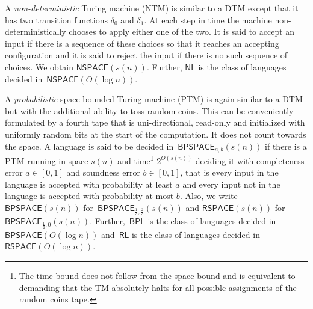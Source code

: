 A \emph{non-deterministic} Turing machine (NTM) is similar to a DTM except that it has two transition functions $\delta_{0}$ and $\delta_{1}$. At each step in time the machine non-deterministically chooses to apply either one of the two.
It is said to accept an input if there is a sequence of these choices so that it reaches an accepting configuration and it is said to reject the input if there is no such sequence of choices.
We obtain $\mathsf{NSPACE}(s(n))$. Further, $\mathsf{NL}$ is the class of languages decided in $\mathsf{NSPACE}(O(\log n))$.\par




A \emph{probabilistic} space-bounded Turing machine (PTM) is again similar to a DTM but with the additional ability to toss random coins. This can be conveniently formulated by a fourth tape that is uni-directional, read-only and initialized with uniformly random bits at the start of the computation. It does not count towards the space.
A language is said to be decided in $\mathsf{BPSPACE}_{a,b}(s(n))$ if there is a PTM running in space $s(n)$ and time\footnote{The time bound does not follow from the space-bound and is equivalent to demanding that the TM absolutely halts for all possible assignments of the random coins tape.} $2^{O(s(n))}$ deciding it with completeness error $a\in[0,1]$ and soundness error $b\in[0,1]$, that is every input in the language is accepted with probability at least $a$ and every input not in the language is accepted with probability at most $b$.
Also, we write $\mathsf{BPSPACE}(s(n))$ for $\mathsf{BPSPACE}_{\frac{1}{3},\frac{2}{3}}(s(n))$ and $\mathsf{RSPACE}(s(n))$ for $\mathsf{BPSPACE}_{\frac{1}{2},0}(s(n))$. Further, $\mathsf{BPL}$ is the class of languages decided in $\mathsf{BPSPACE}(O(\log n))$ and $\mathsf{RL}$ is the class of languages decided in $\mathsf{RSPACE}(O(\log n))$.\par




